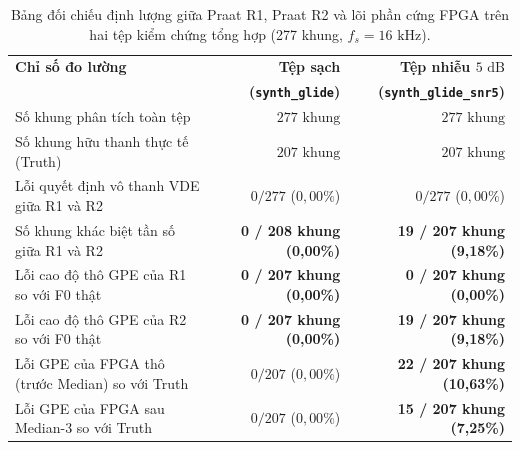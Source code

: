 \begin{table}[htbp]
\centering
\small
\setlength{\tabcolsep}{5pt}
\caption{Bảng đối chiếu định lượng giữa Praat R1, Praat R2 và lõi phần cứng FPGA trên hai tệp kiểm chứng tổng hợp (277 khung, $f_s = 16\text{ kHz}$).}
\label{tab:ch11_r1_vs_r2}
\begin{tabular}{p{7.2cm}rr}
\toprule
\textbf{Chỉ số đo lường} & \textbf{Tệp sạch} & \textbf{Tệp nhiễu $5\text{ dB}$} \\
& \textbf{(\texttt{synth\_glide})} & \textbf{(\texttt{synth\_glide\_snr5})} \\
\midrule
Số khung phân tích toàn tệp & $277\text{ khung}$ & $277\text{ khung}$ \\
Số khung hữu thanh thực tế (Truth) & $207\text{ khung}$ & $207\text{ khung}$ \\
Lỗi quyết định vô thanh VDE giữa R1 và R2 & $0 / 277$ ($0{,}00\%$) & $0 / 277$ ($0{,}00\%$) \\
Số khung khác biệt tần số giữa R1 và R2 & \textbf{0 / 208 khung (0,00\%)} & \textbf{19 / 207 khung (9,18\%)} \\
Lỗi cao độ thô GPE của R1 so với F0 thật & \textbf{0 / 207 khung (0,00\%)} & \textbf{0 / 207 khung (0,00\%)} \\
Lỗi cao độ thô GPE của R2 so với F0 thật & \textbf{0 / 207 khung (0,00\%)} & \textbf{19 / 207 khung (9,18\%)} \\
Lỗi GPE của FPGA thô (trước Median) so với Truth & $0 / 207$ ($0{,}00\%$) & \textbf{22 / 207 khung (10,63\%)} \\
Lỗi GPE của FPGA sau Median-3 so với Truth & $0 / 207$ ($0{,}00\%$) & \textbf{15 / 207 khung (7,25\%)} \\
\bottomrule
\end{tabular}
\end{table}

